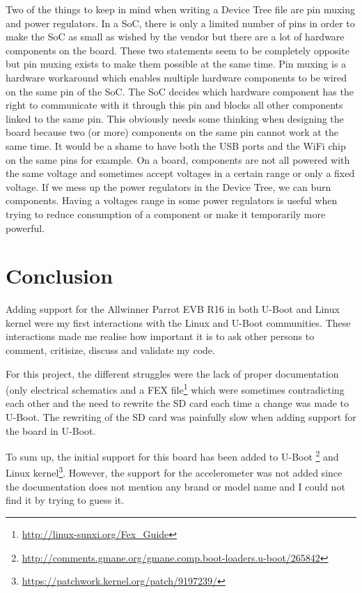 Two of the things to keep in mind when writing a Device Tree file are pin muxing and power regulators. In a SoC, there is only a limited number of pins in order to make the SoC as small as wished by the vendor but there are a lot of hardware components on the board. These two statements seem to be completely opposite but pin muxing exists to make them possible at the same time. Pin muxing is a hardware workaround which enables multiple hardware components to be wired on the same pin of the SoC. The SoC decides which hardware component has the right to communicate with it through this pin and blocks all other components linked to the same pin. This obviously needs some thinking when designing the board because two (or more) components on the same pin cannot work at the same time. It would be a shame to have both the USB ports and the WiFi chip on the same pins for example. On a board, components are not all powered with the same voltage and sometimes accept voltages in a certain range or only a fixed voltage. If we mess up the power regulators in the Device Tree, we can burn components. Having a voltages range in some power regulators is useful when trying to reduce consumption of a component or make it temporarily more powerful.

\section{Conclusion}

Adding support for the Allwinner Parrot EVB R16 in both U-Boot and Linux kernel were my first interactions with the Linux and U-Boot communities. These interactions made me realise how important it is to ask other persons to comment, critisize, discuss and validate my code.

For this project, the different struggles were the lack of proper documentation (only electrical schematics and a FEX file\footnote{\url{http://linux-sunxi.org/Fex\_Guide}} which were sometimes contradicting each other and the need to rewrite the SD card each time a change was made to U-Boot. The rewriting of the SD card was painfully slow when adding support for the board in U-Boot.

To sum up, the initial support for this board has been added to U-Boot \footnote{\url{http://comments.gmane.org/gmane.comp.boot-loaders.u-boot/265842}} and Linux kernel\footnote{\url{https://patchwork.kernel.org/patch/9197239/}}. However, the support for the accelerometer was not added since the documentation does not mention any brand or model name and I could not find it by trying to guess it.
